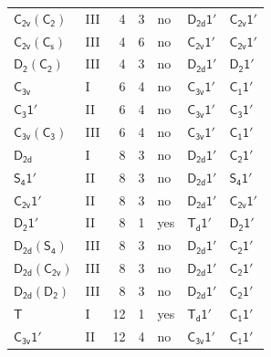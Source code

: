 \documentclass[10pt,a4paper]{article}
\numberwithin{equation}{section}
\newcommand{\grp}[1]{\mathsf{#1}}
\begin{document}
{\begin{longtable}{@{}llrrlll@{}}
\href{C2v-C2.pdf}{$\grp{C_{2v}}(\grp{C_{2}})$} & III & 4 & 3 & no & \href{D2d-1p.pdf}{$\grp{D_{2d}1'}$} & \href{C2v-1p.pdf}{$\grp{C_{2v}1'}$}\\
\href{C2v-C1v.pdf}{$\grp{C_{2v}}(\grp{C_{s}})$} & III & 4 & 6 & no & \href{C2v-1p.pdf}{$\grp{C_{2v}1'}$} & \href{C2v-1p.pdf}{$\grp{C_{2v}1'}$}\\
\href{D2-C2.pdf}{$\grp{D_{2}}(\grp{C_{2}})$} & III & 4 & 3 & no & \href{D2d-1p.pdf}{$\grp{D_{2d}1'}$} & \href{D2-1p.pdf}{$\grp{D_{2}1'}$}\\
\href{../../../rotation/data/pdf/C3v.pdf}{$\grp{C_{3v}}$} & I & 6 & 4 & no & \href{C3v-1p.pdf}{$\grp{C_{3v}1'}$} & \href{C1-1p.pdf}{$\grp{C_{1}1'}$}\\
\href{C3-1p.pdf}{$\grp{C_{3}1'}$} & II & 6 & 4 & no & \href{C3v-1p.pdf}{$\grp{C_{3v}1'}$} & \href{C3-1p.pdf}{$\grp{C_{3}1'}$}\\
\href{C3v-C3.pdf}{$\grp{C_{3v}}(\grp{C_{3}})$} & III & 6 & 4 & no & \href{C3v-1p.pdf}{$\grp{C_{3v}1'}$} & \href{C1-1p.pdf}{$\grp{C_{1}1'}$}\\
\href{../../../rotation/data/pdf/D2d.pdf}{$\grp{D_{2d}}$} & I & 8 & 3 & no & \href{D2d-1p.pdf}{$\grp{D_{2d}1'}$} & \href{C2-1p.pdf}{$\grp{C_{2}1'}$}\\
\href{S4-1p.pdf}{$\grp{S_{4}1'}$} & II & 8 & 3 & no & \href{D2d-1p.pdf}{$\grp{D_{2d}1'}$} & \href{S4-1p.pdf}{$\grp{S_{4}1'}$}\\
\href{C2v-1p.pdf}{$\grp{C_{2v}1'}$} & II & 8 & 3 & no & \href{D2d-1p.pdf}{$\grp{D_{2d}1'}$} & \href{C2v-1p.pdf}{$\grp{C_{2v}1'}$}\\
\href{D2-1p.pdf}{$\grp{D_{2}1'}$} & II & 8 & 1 & yes & \href{Td-1p.pdf}{$\grp{T_{d}1'}$} & \href{D2-1p.pdf}{$\grp{D_{2}1'}$}\\
\href{D2d-S4.pdf}{$\grp{D_{2d}}(\grp{S_{4}})$} & III & 8 & 3 & no & \href{D2d-1p.pdf}{$\grp{D_{2d}1'}$} & \href{C2-1p.pdf}{$\grp{C_{2}1'}$}\\
\href{D2d-C2v.pdf}{$\grp{D_{2d}}(\grp{C_{2v}})$} & III & 8 & 3 & no & \href{D2d-1p.pdf}{$\grp{D_{2d}1'}$} & \href{C2-1p.pdf}{$\grp{C_{2}1'}$}\\
\href{D2d-D2.pdf}{$\grp{D_{2d}}(\grp{D_{2}})$} & III & 8 & 3 & no & \href{D2d-1p.pdf}{$\grp{D_{2d}1'}$} & \href{C2-1p.pdf}{$\grp{C_{2}1'}$}\\
\href{../../../rotation/data/pdf/T.pdf}{$\grp{T}$} & I & 12 & 1 & yes & \href{Td-1p.pdf}{$\grp{T_{d}1'}$} & \href{C1-1p.pdf}{$\grp{C_{1}1'}$}\\
\href{C3v-1p.pdf}{$\grp{C_{3v}1'}$} & II & 12 & 4 & no & \href{C3v-1p.pdf}{$\grp{C_{3v}1'}$} & \href{C1-1p.pdf}{$\grp{C_{1}1'}$}\\

\end{longtable}}
\end{document}
